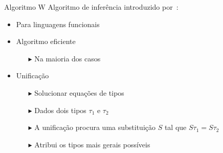 \newcommand{\defas}{\ensuremath{\overset{def}{=}}}
\newcommand{\fv}{\ensuremath{\text{FV}}}
\newcommand{\fvc}{\ensuremath{\text{FVC}}}
\newcommand{\eeq}{\ensuremath{\overset{e}{=}}}
\newcommand{\Append}{\ensuremath{\texttt{++}}}
\newcommand{\If}{\ensuremath{\text{se}}}
\newcommand{\Let}{\ensuremath{\text{let}}}
\newcommand{\In}{\ensuremath{\text{in}}}
\newcommand{\Then}{\ensuremath{\text{então}}}
\newcommand{\Return}{\ensuremath{\text{retorna}}}
\newcommand{\Else}{\ensuremath{\text{senão}}}
\newcommand{\Elseif}{\ensuremath{\text{senão se}}}
\newcommand{\Fail}{\ensuremath{\text{falha}}}
\newcommand{\Unify}{\ensuremath{\textit{unify}}}
\newcommand{\Occurs}{\ensuremath{\textit{occurs}}}
\newcommand{\True}{\ensuremath{\texttt{Verdadeiro}}}
\newcommand{\False}{\ensuremath{\texttt{Falso}}}
\newcommand{\Whitespace}{\ensuremath{\texttt{ }}}
\newcommand{\TODO}[1]{\textcolor{red}{\textbf{TODO:} #1}}

\begin{frame}{Algoritmo W}
    Algoritmo de inferência introduzido por~:
    \begin{itemize}
        \item Para linguagens funcionais
        \item[]
        \item Algoritmo eficiente
              \begin{itemize}
                  \item[$\blacktriangleright$] Na maioria dos casos
              \end{itemize}
        \item[]
        \item Unificação
              \begin{itemize}
                  \item[$\blacktriangleright$] Solucionar equações de tipos
                  \item[$\blacktriangleright$] Dados dois tipos $\tau_1$ e $\tau_2$
                  \item[$\blacktriangleright$] A unificação procura uma substituição $S$ tal que $S\tau_1 = S\tau_2$
                  \item[$\blacktriangleright$] Atribui os tipos mais gerais possíveis
              \end{itemize}
    \end{itemize}
\end{frame}
